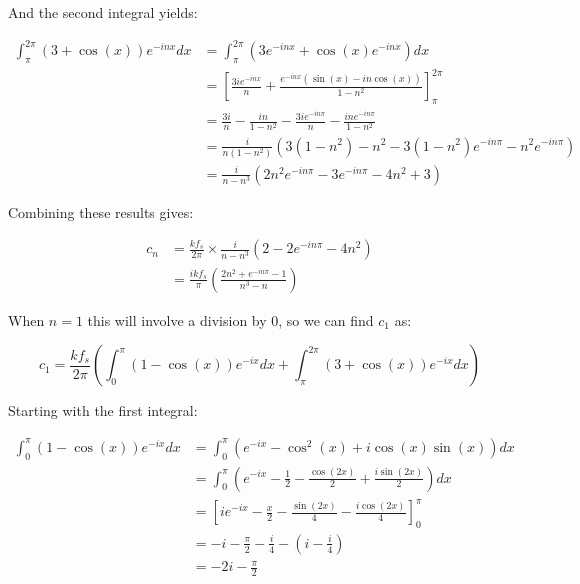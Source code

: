 \begin{appendices}
		And the second integral yields:

		\begin{align}
			\int_{\pi}^{2\pi} (3+\cos(x))e^{-inx} dx & = 
				\int_{\pi}^{2\pi} \left( 3e^{-inx} + \cos(x)e^{-inx} \right) dx \nonumber \\[0.6em]
			& = \left[ \frac{3ie^{-inx}}{n} + \frac{e^{-inx}(\sin(x) - 
				in\cos(x))}{1 - n^{2}} \right]_{\pi}^{2\pi} \nonumber \\[0.6em]
			& = \frac{3i}{n} - \frac{in}{1 - n^{2}} - \frac{3ie^{-in\pi}}{n} - 
				\frac{ine^{-in\pi}}{1 - n^{2}} \nonumber \\[0.6em]
			& = \frac{i}{n(1-n^{2})} \left( 3(1-n^{2}) - n^{2} - 
				3(1-n^{2})e^{-in\pi} - n^{2}e^{-in\pi} \right) \nonumber \\[0.6em]
			& = \frac{i}{n - n^{3}} \left( 2n^{2}e^{-in\pi} - 3e^{-in\pi} - 4n^{2} + 3 \right) \nonumber
		\end{align}

		Combining these results gives:

		\begin{align}
			c_{n} & = \frac{kf_{s}}{2\pi} \times \frac{i}{n - n^{3}} \left( 2 - 2e^{-in\pi} - 4n^{2} \right) 
				\nonumber \\[0.6em]
			& = \frac{ikf_{s}}{\pi} \left( \frac{2n^{2} + e^{-in\pi} - 1}{n^{3} - n} \right) \nonumber
		\end{align}

		When $n = 1$ this will involve a division by 0, so we can find $c_{1}$ as:

		\[ c_{1} = \frac{kf_{s}}{2\pi} \left( \int_{0}^{\pi} (1-\cos(x))e^{-ix} dx
						      + \int_{\pi}^{2\pi} (3 + \cos(x))e^{-ix} dx 
						      \right) \]

		Starting with the first integral:
		
		\begin{align}
			\int_{0}^{\pi} (1-\cos(x))e^{-ix} dx & = \int_{0}^{\pi} \left( e^{-ix} - 
				\cos^{2}(x) + i\cos(x)\sin(x) \right) dx \nonumber \\[0.6em]
			& = \int_{0}^{\pi} \left( e^{-ix} - \frac{1}{2} - 
				\frac{\cos(2x)}{2} + \frac{i\sin(2x)}{2} \right) dx \nonumber \\[0.6em]
			& = \left[ ie^{-ix} - \frac{x}{2} - \frac{\sin(2x)}{4} - 
				\frac{i\cos(2x)}{4} \right]_{0}^{\pi} \nonumber \\[0.6em]
			& = -i - \frac{\pi}{2} - \frac{i}{4} - \left( i - \frac{i}{4} \right) \nonumber \\[0.6em]
			& = -2i - \frac{\pi}{2} \nonumber
		\end{align}


\end{appendices}
